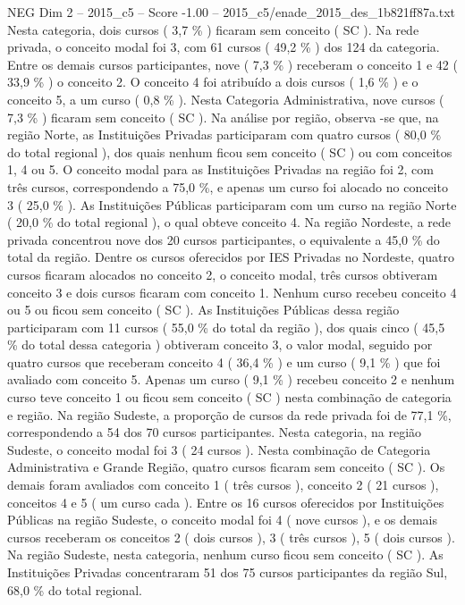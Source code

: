 \begin{textsample}{NEG Dim 2 – 2015\_c5 – Score -1.00 – 2015\_c5/enade\_2015\_des\_1b821ff87a.txt}
Nesta categoria, dois cursos ( 3,7 \% ) ficaram sem conceito ( SC ).
Na rede privada, o conceito modal foi 3, com 61 cursos ( 49,2 \% ) dos 124 da categoria.
Entre os demais cursos participantes, nove ( 7,3 \% ) receberam o conceito 1 e 42 ( 33,9 \% ) o conceito 2.
O conceito 4 foi atribuído a dois cursos ( 1,6 \% ) e o conceito 5, a um curso ( 0,8 \% ).
Nesta Categoria Administrativa, nove cursos ( 7,3 \% ) ficaram sem conceito ( SC ).
Na análise por região, observa -se que, na região Norte, as Instituições Privadas participaram com quatro cursos ( 80,0 \% do total regional ), dos quais nenhum ficou sem conceito ( SC ) ou com conceitos 1, 4 ou 5.
O conceito modal para as Instituições Privadas na região foi 2, com três cursos, correspondendo a 75,0 \%, e apenas um curso foi alocado no conceito 3 ( 25,0 \% ).
As Instituições Públicas participaram com um curso na região Norte ( 20,0 \% do total regional ), o qual obteve conceito 4.
Na região Nordeste, a rede privada concentrou nove dos 20 cursos participantes, o equivalente a 45,0 \% do total da região.
Dentre os cursos oferecidos por IES Privadas no Nordeste, quatro cursos ficaram alocados no conceito 2, o conceito modal, três cursos obtiveram conceito 3 e dois cursos ficaram com conceito 1.
Nenhum curso recebeu conceito 4 ou 5 ou ficou sem conceito ( SC ).
As Instituições Públicas dessa região participaram com 11 cursos ( 55,0 \% do total da região ), dos quais cinco ( 45,5 \% do total dessa categoria ) obtiveram conceito 3, o valor modal, seguido por quatro cursos que receberam conceito 4 ( 36,4 \% ) e um curso ( 9,1 \% ) que foi avaliado com conceito 5.
Apenas um curso ( 9,1 \% ) recebeu conceito 2 e nenhum curso teve conceito 1 ou ficou sem conceito ( SC ) nesta combinação de categoria e região.
Na região Sudeste, a proporção de cursos da rede privada foi de 77,1 \%, correspondendo a 54 dos 70 cursos participantes.
Nesta categoria, na região Sudeste, o conceito modal foi 3 ( 24 cursos ).
Nesta combinação de Categoria Administrativa e Grande Região, quatro cursos ficaram sem conceito ( SC ).
Os demais foram avaliados com conceito 1 ( três cursos ), conceito 2 ( 21 cursos ), conceitos 4 e 5 ( um curso cada ).
Entre os 16 cursos oferecidos por Instituições Públicas na região Sudeste, o conceito modal foi 4 ( nove cursos ), e os demais cursos receberam os conceitos 2 ( dois cursos ), 3 ( três cursos ), 5 ( dois cursos ).
Na região Sudeste, nesta categoria, nenhum curso ficou sem conceito ( SC ).
As Instituições Privadas concentraram 51 dos 75 cursos participantes da região Sul, 68,0 \% do total regional.

\end{textsample}

